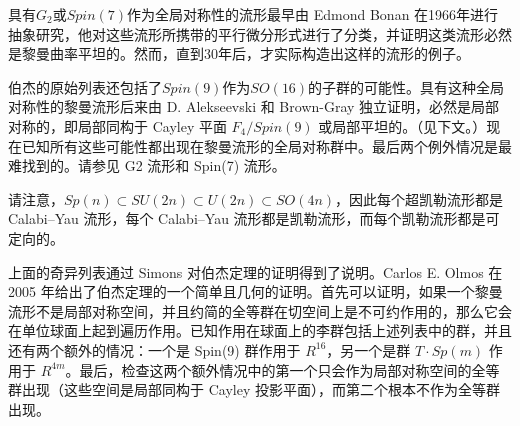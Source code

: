 具有\(G_2\)或\(Spin(7)\)作为全局对称性的流形最早由 Edmond Bonan 在1966年进行抽象研究，他对这些流形所携带的平行微分形式进行了分类，并证明这类流形必然是黎曼曲率平坦的。然而，直到30年后，才实际构造出这样的流形的例子。

伯杰的原始列表还包括了\(Spin(9)\)作为\(SO(16)\)的子群的可能性。具有这种全局对称性的黎曼流形后来由 D. Alekseevski 和 Brown-Gray 独立证明，必然是局部对称的，即局部同构于 Cayley 平面 \( F_4 / Spin(9) \) 或局部平坦的。（见下文。）现在已知所有这些可能性都出现在黎曼流形的全局对称群中。最后两个例外情况是最难找到的。请参见 G2 流形和 Spin(7) 流形。

请注意，\( Sp(n) \subset SU(2n) \subset U(2n) \subset SO(4n) \)，因此每个超凯勒流形都是 Calabi–Yau 流形，每个 Calabi–Yau 流形都是凯勒流形，而每个凯勒流形都是可定向的。

上面的奇异列表通过 Simons 对伯杰定理的证明得到了说明。Carlos E. Olmos 在 2005 年给出了伯杰定理的一个简单且几何的证明。首先可以证明，如果一个黎曼流形不是局部对称空间，并且约简的全等群在切空间上是不可约作用的，那么它会在单位球面上起到遍历作用。已知作用在球面上的李群包括上述列表中的群，并且还有两个额外的情况：一个是 Spin(9) 群作用于 \( R^{16} \)，另一个是群 \( T \cdot Sp(m) \) 作用于 \( R^{4m} \)。最后，检查这两个额外情况中的第一个只会作为局部对称空间的全等群出现（这些空间是局部同构于 Cayley 投影平面），而第二个根本不作为全等群出现。